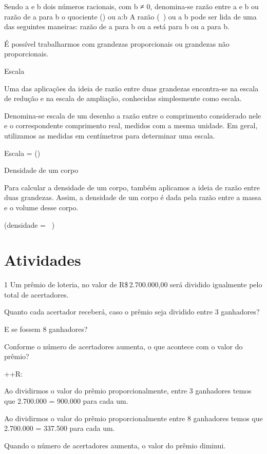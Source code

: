 Sendo a e b dois números racionais, com b ≠ 0, denomina-se razão entre a
e b ou razão de a para b o quociente () ou a:b \cdot A razão
(\ ) ou a \div b pode ser lida de uma das seguintes maneiras:
razão de a para b ou a está para b ou a para b.

É possível trabalharmos com grandezas proporcionais ou grandezas não
proporcionais.

Escala

Uma das aplicações da ideia de razão entre duas grandezas encontra-se na
escala de redução e na escala de ampliação, conhecidas simplesmente como
escala.

Denomina-se escala de um desenho a razão entre o comprimento considerado
nele e o correspondente comprimento real, medidos com a mesma unidade.
Em geral, utilizamos as medidas em centímetros para determinar uma
escala.

Escala =
()

Densidade de um corpo

Para calcular a densidade de um corpo, também aplicamos a ideia de razão
entre duas grandezas. Assim, a densidade de um corpo é dada pela razão
entre a massa e o volume desse corpo.

(densidade = \ )

\section{Atividades}

\num{1} Um prêmio de loteria, no valor de R\$\,2.700.000,00 será dividido
igualmente pelo total de acertadores.
\item Quanto cada acertador receberá, caso o prêmio seja dividido entre 3
ganhadores?
\item E se fossem 8 ganhadores?
\item Conforme o número de acertadores aumenta, o que acontece com o valor
do prêmio?

++R:
\item Ao dividirmos o valor do prêmio proporcionalmente, entre 3 ganhadores
temos que 2.700.000  = 900.000 para cada um.
\item Ao dividirmos o valor do prêmio proporcionalmente entre 8 ganhadores
temos que 2.700.000  = 337.500 para cada um.
\item Quando o número de acertadores aumenta, o valor do prêmio diminui.

